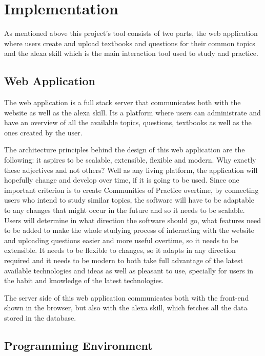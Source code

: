 \chapter{Implementation}
\label{cha:implementation}

As mentioned above this project's tool consists of two parts, 
the web application where users create and upload textbooks and questions for their common 
topics and the alexa skill which is the main interaction tool used to study and practice.

\section{Web Application}

The web application is a full stack server that communicates both with the website as well 
as the alexa skill. Its a platform where users can administrate and have an overview of 
all the available topics, questions, textbooks as well as the ones created by the user.

The architecture principles behind the design of this web application are the following:
it aspires to be scalable, extensible, flexible and modern. Why exactly these adjectives
and not others? Well as any living platform, the application will hopefully change and
develop over time, if it is going to be used. Since one important criterion is to 
create Communities of Practice overtime, by connecting users who intend to study
similar topics, the software will have to be adaptable to any changes that might occur 
in the future and so it needs to be scalable. Users will determine in what direction 
the software should go, what features need to be added to make the whole studying 
process of interacting with the website and uploading questions easier and more useful
overtime, so it needs to be extensible. It needs to be flexible to changes, so it 
adapts in any direction required and it needs to be modern to both take full advantage
of the latest available technologies and ideas as well as pleasant to use, specially
for users in the habit and knowledge of the latest technologies.

The server side of this web application communicates both with the front-end shown
in the browser, but also with the alexa skill, which fetches all the data stored 
in the database.


\section{Programming Environment}

